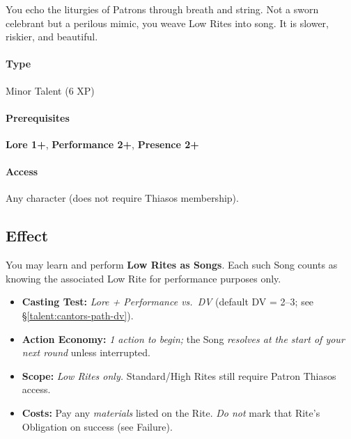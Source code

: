 \begin{tcolorbox}[colback=black!3,colframe=black!40!white,title={Cantor's Path}]
You echo the liturgies of Patrons through breath and string. Not a sworn celebrant but a perilous mimic, you weave Low Rites into song. It is slower, riskier, and beautiful.
\end{tcolorbox}

\paragraph*{Type} Minor Talent (6 XP) \quad
\paragraph*{Prerequisites} \textbf{Lore 1+}, \textbf{Performance 2+}, \textbf{Presence 2+} \quad
\paragraph*{Access} Any character (does not require Thiasos membership).

\subsection*{Effect}
You may learn and perform \textbf{Low Rites as Songs}. Each such Song counts as knowing the associated Low Rite for performance purposes only.

\begin{itemize}
\item \textbf{Casting Test:} \emph{Lore + Performance vs.\ DV} (default DV = 2--3; see \S\ref{talent:cantors-path-dv}).
\item \textbf{Action Economy:} \emph{1 action to begin;} the Song \emph{resolves at the start of your next round} unless interrupted.
\item \textbf{Scope:} \emph{Low Rites only.} Standard/High Rites still require Patron Thiasos access.
\item \textbf{Costs:} Pay any \emph{materials} listed on the Rite. \emph{Do not} mark that Rite’s Obligation on success (see Failure).
\end{itemize}

